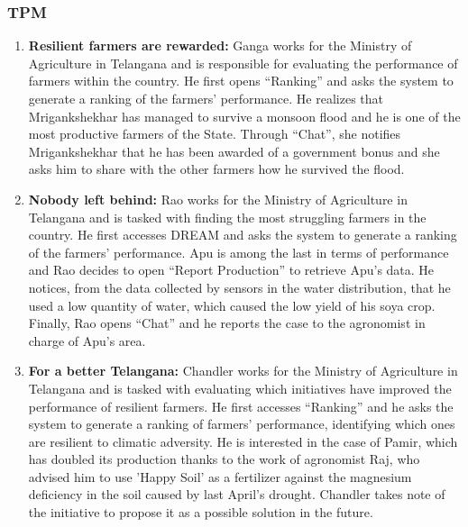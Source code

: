 \subsubsection{TPM}
\begin{enumerate}[label=\textbf{TPM.\arabic*}]
    \item \textbf{Resilient farmers are rewarded: }Ganga works for the Ministry of Agriculture in Telangana and is responsible for evaluating the performance of farmers within the country. He first opens “Ranking” and asks the system to generate a ranking of the farmers' performance. He realizes that Mrigankshekhar has managed to survive a monsoon flood and he is one of the most productive farmers of the State. Through “Chat”, she notifies Mrigankshekhar that he has been awarded of a government bonus and she asks him to share with the other farmers how he survived the flood.
    \item \textbf{Nobody left behind: }Rao works for the Ministry of Agriculture in Telangana and is tasked with finding the most struggling farmers in the country. He first accesses DREAM and asks the system to generate a ranking of the farmers' performance. Apu is among the last in terms of performance and Rao decides to open “Report Production” to retrieve Apu’s data. He notices, from the data collected by sensors in the water distribution, that he used a low quantity of water, which caused the low yield of his soya crop. Finally, Rao opens “Chat” and he reports the case to the agronomist in charge of Apu's area.
    \item\textbf{For a better Telangana: }Chandler works for the Ministry of Agriculture in Telangana and is tasked with evaluating which initiatives have improved the performance of resilient farmers. He first accesses “Ranking” and he asks the system to generate a ranking of farmers' performance, identifying which ones are resilient to climatic adversity. He is interested in the case of Pamir, which has doubled its production thanks to the work of agronomist Raj, who advised him to use 'Happy Soil' as a fertilizer against the magnesium deficiency in the soil caused by last April's drought. Chandler takes note of the initiative to propose it as a possible solution in the future.
\end{enumerate}
